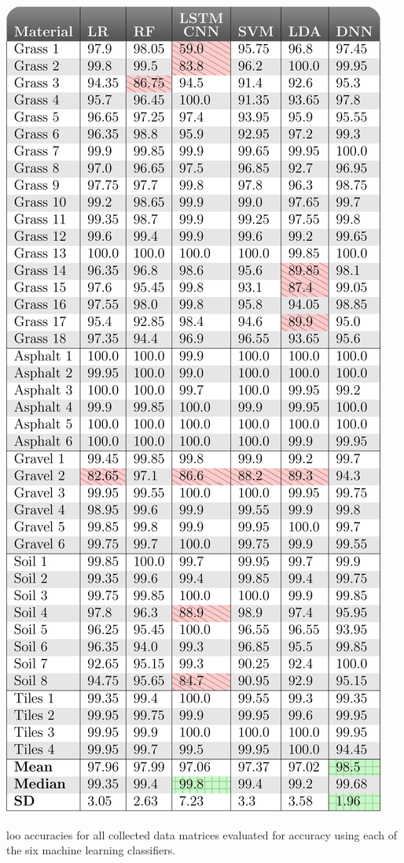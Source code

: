 \begin{table}[h]
	\centering
	\includegraphics[scale=0.5]{figs_temp/loo_table.jpg}
	\caption{\gls{loo} accuracies for all collected data matrices evaluated for accuracy using each of the six machine learning classifiers.}
\label{tab:loo}
\end{table}

